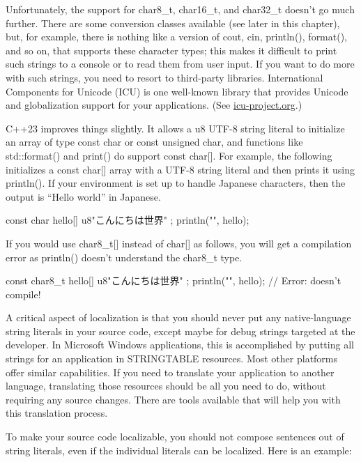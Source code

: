 Unfortunately, the support for char8\_t, char16\_t, and char32\_t doesn’t go much further. There are some conversion classes available (see later in this chapter), but, for example, there is nothing like a version of cout, cin, println(), format(), and so on, that supports these character types; this makes it difficult to print such strings to a console or to read them from user input. If you want to do more with such strings, you need to resort to third-party libraries. International Components for Unicode (ICU) is one well-known library that provides Unicode and globalization support for your applications. (See \url{icu-project.org}.)


C++23 improves things slightly. It allows a u8 UTF-8 string literal to initialize an array of type const char or const unsigned char, and functions like std::format() and print() do support const char[]. For example, the following initializes a const char[] array with a UTF-8 string literal and then prints it using println(). If your environment is set up to handle Japanese characters, then the output is “Hello world” in Japanese.

\begin{cpp}
const char hello[] { u8"こんにちは世界" };
println("{}", hello);
\end{cpp}

If you would use char8\_t[] instead of char[] as follows, you will get a compilation error as println() doesn’t understand the char8\_t type.

\begin{cpp}
const char8_t hello[] { u8"こんにちは世界" };
println("{}", hello); // Error: doesn't compile!
\end{cpp}


A critical aspect of localization is that you should never put any native-language string literals in your source code, except maybe for debug strings targeted at the developer. In Microsoft Windows applications, this is accomplished by putting all strings for an application in STRINGTABLE resources. Most other platforms offer similar capabilities. If you need to translate your application to another language, translating those resources should be all you need to do, without requiring any source changes.
There are tools available that will help you with this translation process.

To make your source code localizable, you should not compose sentences out of string literals, even if the individual literals can be localized. Here is an example:


